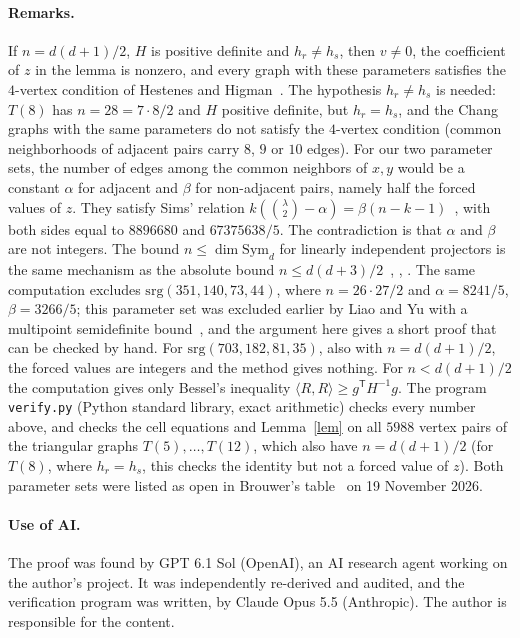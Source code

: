 \documentclass[11pt]{article}
\newcommand{\Sym}{\mathrm{Sym}}
\begin{document}
\paragraph{Remarks.}
If $n=d(d+1)/2$, $H$ is positive definite and $h_r\ne h_s$, then $v\ne0$, the coefficient of $z$ in the lemma is
nonzero, and every graph with these parameters satisfies the $4$-vertex condition of Hestenes and Higman~\cite{HH}.
The hypothesis $h_r\ne h_s$ is needed: $T(8)$ has $n=28=7\cdot8/2$ and $H$ positive definite, but $h_r=h_s$, and the
Chang graphs with the same parameters do not satisfy the $4$-vertex condition (common neighborhoods of adjacent pairs
carry $8$, $9$ or $10$ edges). For our two parameter sets, the number of edges among the common neighbors of $x,y$
would be a constant $\alpha$ for
adjacent and $\beta$ for non-adjacent pairs, namely half the forced values of $z$. They satisfy Sims' relation
$k(\binom\lambda2-\alpha)=\beta(n-k-1)$~\cite[Prop.~8.16.1]{BvM}, with both sides equal to $8896680$ and $67375638/5$.
The contradiction is that $\alpha$ and $\beta$ are not integers. The bound $n\le\dim\Sym_d$ for linearly independent
projectors is the same mechanism as the absolute bound $n\le d(d+3)/2$~\cite{DGS}, \cite{CGS}, \cite[\S1.3.7]{BvM}.
The same computation excludes $\mathrm{srg}(351,140,73,44)$, where $n=26\cdot27/2$ and $\alpha=8241/5$,
$\beta=3266/5$; this parameter set was excluded earlier by Liao and Yu with a multipoint semidefinite
bound~\cite{LY}, and the argument here gives a short proof that can be checked by hand. For
$\mathrm{srg}(703,182,81,35)$, also with $n=d(d+1)/2$, the forced values are integers and the method gives nothing.
For $n<d(d+1)/2$ the computation gives only Bessel's inequality $\langle R,R\rangle\ge g^{\mathsf T}H^{-1}g$. The program
\texttt{verify.py} (Python standard library, exact arithmetic) checks every number above, and checks the cell equations
and Lemma~\ref{lem} on all $5988$ vertex pairs of the triangular graphs $T(5),\dots,T(12)$, which also have
$n=d(d+1)/2$ (for $T(8)$, where $h_r=h_s$, this checks the identity but not a forced value of $z$). Both parameter sets were listed as open in Brouwer's table~\cite{table} on 19 November 2026.

\paragraph{Use of AI.} The proof was found by GPT 6.1 Sol (OpenAI), an AI research agent working on the author's project.
It was independently re-derived and audited, and the verification program was written, by Claude Opus 5.5
(Anthropic). The author is responsible for the content.
\end{document}
